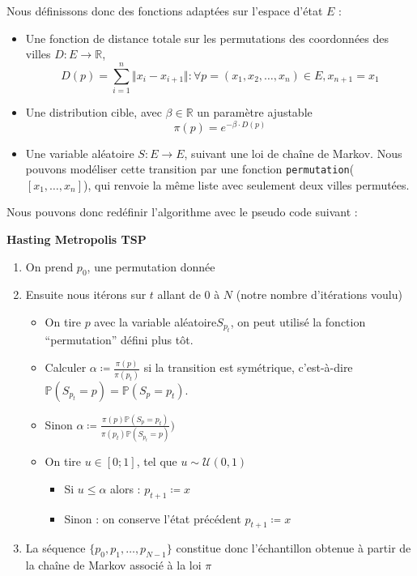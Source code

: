 \documentclass{article}
\begin{document}
Nous définissons donc des fonctions adaptées sur l'espace d'état $E$ : \begin{itemize} \item Une fonction de distance totale sur les permutations des coordonnées des villes $ D : E \to \mathbb{R} $,
    \[ D(p) = \sum_{i = 1}^{n} \Vert x_i - x_{i+1}\Vert : \forall p = (x_1,x_2,\ldots , x_n) \in E, x_{n+1} = x_{1}\]

    \item Une distribution cible, avec $\beta \in \mathbb{R}$ un paramètre ajustable
    \[ \pi(p) = e^{-\beta \cdot D(p)} \]

    \item Une variable aléatoire $S: E \to E$, suivant une loi de chaîne de Markov.  
    Nous pouvons modéliser cette transition par une fonction \texttt{permutation}( $[x_1, \ldots, x_n]$), qui renvoie la même liste avec seulement deux villes permutées. 
\end{itemize}

Nous pouvons donc redéfinir l'algorithme avec le pseudo code suivant :

{\bf Hasting Metropolis TSP} \begin{enumerate}
    \item On prend $p_0$, une permutation donnée
    \item Ensuite nous itérons sur $t$ allant de 0 à $N$ (notre nombre d'itérations voulu)
    \begin{itemize}
        \item On tire $p$ avec la variable aléatoire$S_{p_t}$, on peut utilisé la fonction ``permutation'' défini plus tôt.
        \item Calculer $\alpha \coloneqq \frac{\pi(p)}{\pi(p_t)}$ si la transition est symétrique, c'est-à-dire $\mathbb{P}(S_{p_t} = p) = \mathbb{P}(S_p = p_t)$.
        \item Sinon $\alpha \coloneqq \frac{\pi(p) \mathbb{P}(S_p = p_t)}{\pi(p_t) \mathbb{P}(S_{p_t} = p) } ) $ 

        \item On tire $u \in [0;1]$, tel que $u  \sim \mathcal{U}(0,1)$ 
        \begin{itemize}
            \item Si $u \leqslant \alpha$ alors : $p_{t+1} \coloneqq x$  
            \item Sinon : on conserve l'état précédent $p_{t+1} \coloneqq x$  
        \end{itemize}
    \end{itemize}
    \item La séquence $\{p_0,p_1, \ldots ,p_{N-1}\}$ constitue donc l'échantillon obtenue à partir de la chaîne de Markov associé à la loi $\pi$
\end{enumerate}
\end{document}
